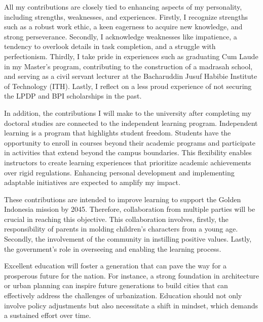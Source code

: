 \documentclass[../main.tex]{subfiles}
\begin{document}
All my contributions are closely tied to enhancing aspects of my personality, including strengths, weaknesses, and experiences. Firstly, I recognize strengths such as a robust work ethic, a keen eagerness to acquire new knowledge, and strong perseverance. Secondly, I acknowledge weaknesses like impatience, a tendency to overlook details in task completion, and a struggle with perfectionism. Thirdly, I take pride in experiences such as graduating Cum Laude in my Master's program, contributing to the construction of a madrasah school, and serving as a civil servant lecturer at the Bacharuddin Jusuf Habibie Institute of Technology (ITH). Lastly, I reflect on a less proud experience of not securing the LPDP and BPI scholarships in the past.

In addition, the contributions I will make to the university after completing my doctoral studies are connected to the independent learning program. Independent learning is a program that highlights student freedom. Students have the opportunity to enroll in courses beyond their academic programs and participate in activities that extend beyond the campus boundaries. This flexibility enables instructors to create learning experiences that prioritize academic achievements over rigid regulations. Enhancing personal development and implementing adaptable initiatives are expected to amplify my impact.

These contributions are intended to improve learning to support the Golden Indonesia mission by 2045. Therefore, collaboration from multiple parties will be crucial in reaching this objective. This collaboration involves, firstly, the responsibility of parents in molding children's characters from a young age. Secondly, the involvement of the community in instilling positive values. Lastly, the government's role in overseeing and enabling the learning process.

Excellent education will foster a generation that can pave the way for a prosperous future for the nation. For instance, a strong foundation in architecture or urban planning can inspire future generations to build cities that can effectively address the challenges of urbanization. Education should not only involve policy adjustments but also necessitate a shift in mindset, which demands a sustained effort over time.


\end{document}
